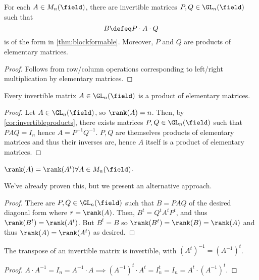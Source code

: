 \begin{corollary}\label{cor:invertibleproducts}
    For each $A \in M_n(\field)$, there are invertible matrices $P, Q \in \GL_n(\field)$ such that \[
    B \defeq P \cdot A \cdot Q    
    \]
    is of the form in \cref{thm:blockformable}. Moreover, $P$ and $Q$ are products of elementary matrices.
\end{corollary}

\begin{proof}
    Follows from row/column operations corresponding to left/right multiplication by elementary matrices.
\end{proof}

\begin{corollary}
    Every invertible matrix $A \in \GL_n(\field)$ is a product of elementary matrices.
\end{corollary}
\begin{proof}
    Let $A \in \GL_n(\field)$, so $\rank(A) = n$. Then, by \cref{cor:invertibleproducts}, there exists matrices $P, Q \in \GL_n(\field)$ such that $P A Q = I_n$ hence $A = P^{-1}Q^{-1}$. $P,Q$ are themselves products of elementary matrices and thus their inverses are, hence $A$ itself is a product of elementary matrices.
\end{proof}

\begin{corollary}
    $\rank(A) = \rank(A^t) \forall A \in M_n(\field)$.
\end{corollary}

\begin{remark}
    We've already proven this, but we present an alternative approach.
\end{remark}

\begin{proof}
    There are $P, Q \in \GL_n(\field)$ such that $B = PAQ$ of the desired diagonal form where $r = \rank(A)$. Then, $B^t = Q^t A^t P^t$, and thus $\rank(B^t) = \rank(A^t)$. But $B^t = B$ so $\rank(B^t) = \rank(B) = \rank(A)$ and thus $\rank(A) = \rank(A^t)$ as desired.
\end{proof}

\begin{corollary}
    The transpose of an invertible matrix is invertible, with $(A^t)^{-1} = (A^{-1})^t$.
\end{corollary}
\begin{proof}  
    $A \cdot A^{-1} = I_n = A^{-1}\cdot A \implies (A^{-1})^t \cdot A^t = I_n^t = I_n = A^t \cdot (A^{-1})^t$.
\end{proof}